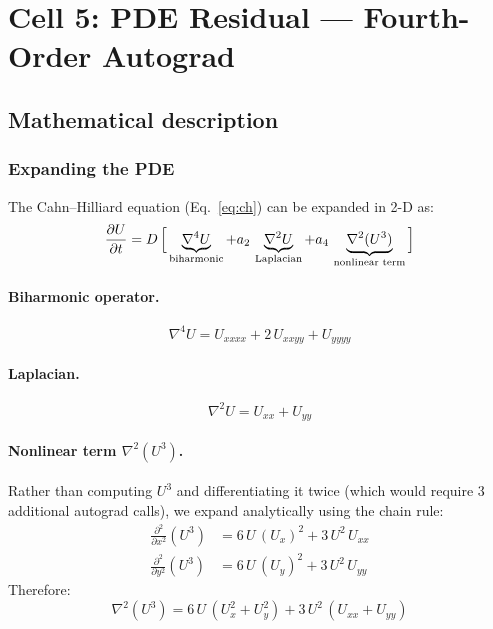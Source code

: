 \documentclass[11pt,a4paper]{article}
\begin{document}
\section{Cell 5: PDE Residual --- Fourth-Order Autograd}
\label{sec:residual}

\subsection*{Mathematical description}

\subsubsection*{Expanding the PDE}

The Cahn--Hilliard equation (Eq.~\eqref{eq:ch}) can be expanded in 2-D as:
\begin{equation}
  \frac{\partial U}{\partial t}
  = D\,\Bigl[\,
    \underbrace{\nabla^{4} U}_{\text{biharmonic}}
    + a_2\,\underbrace{\nabla^{2} U}_{\text{Laplacian}}
    + a_4\,\underbrace{\nabla^{2}(U^{3})}_{\text{nonlinear term}}
  \,\Bigr]
\label{eq:ch_expanded}
\end{equation}

\paragraph{Biharmonic operator.}
\begin{equation}
  \nabla^{4} U = U_{xxxx} + 2\,U_{xxyy} + U_{yyyy}
\label{eq:biharm}
\end{equation}

\paragraph{Laplacian.}
\begin{equation}
  \nabla^{2} U = U_{xx} + U_{yy}
\label{eq:laplacian}
\end{equation}

\paragraph{Nonlinear term $\nabla^{2}(U^3)$.}
Rather than computing $U^3$ and differentiating it twice (which would
require 3 additional autograd calls), we expand analytically using the
chain rule:
\begin{align}
  \frac{\partial^2}{\partial x^2}(U^3)
  &= 6\,U\,(U_x)^2 + 3\,U^2\,U_{xx} \label{eq:u3xx}\\
  \frac{\partial^2}{\partial y^2}(U^3)
  &= 6\,U\,(U_y)^2 + 3\,U^2\,U_{yy} \label{eq:u3yy}
\end{align}
Therefore:
\begin{equation}
  \nabla^{2}(U^3) = 6\,U\,(U_x^2 + U_y^2) + 3\,U^2\,(U_{xx} + U_{yy})
\label{eq:lap_u3}
\end{equation}
\end{document}
